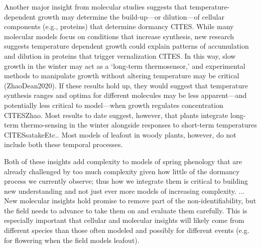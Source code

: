 \documentclass[11pt]{article}
\begin{document}
Another major insight from molecular studies suggests that temperature-dependent growth may determine the build-up---or dilution---of cellular components (e.g., proteins) that determine dormancy CITES. While many molecular models focus on conditions that increase synthesis, new research suggests temperature dependent growth could explain patterns of accumulation and dilution in proteins that trigger vernalization CITES. In this way, slow growth in the winter may act as a `long-term thermosensor,' and experimental methods to manipulate growth without altering temperature may be critical (ZhaoDean2020). If these results hold up, they would suggest that temperature synthesis ranges and optima for different molecules may be less apparent---and potentially less critical to model---when growth regulates concentration CITESZhao. Most results to date suggest, however, that plants integrate long-term thermo-sensing in the winter alongside responses to short-term temperatures CITESsatakeEtc.. Most models of leafout in woody plants, however, do not include both these temporal processes. 


Both of these insights add complexity to models of spring phenology that are already challenged by too much complexity given how little of the dormancy process we currently observe; thus how we integrate them is critical to building new understanding and not just ever more models of increasing complexity. ... New molecular insights hold promise to remove part of the non-identifiability, but the field needs to advance to take them on and evaluate them carefully. This is especially important that cellular and molecular insights will likely come from different species than those often modeled and possibly for different events (e.g. for flowering when the field models leafout). 
\end{document}
